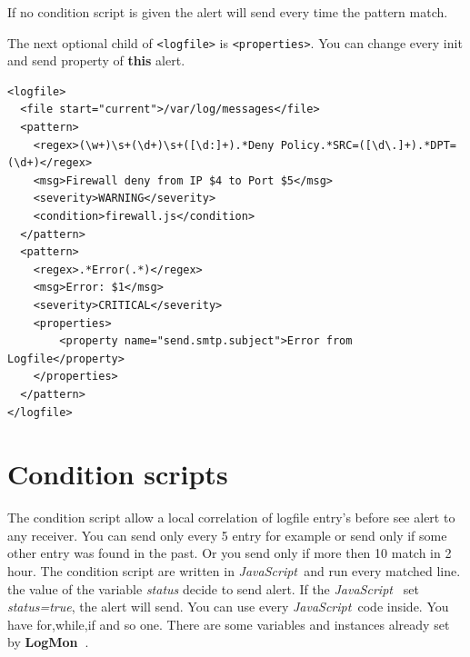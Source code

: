 \documentclass[11pt,a4paper]{article}
\newcommand{\logmon}{\textbf{LogMon\ }}
\newcommand{\js}{\textit{JavaScript\ }}
\begin{document}
If no condition script is given the alert will send every time the pattern
match.

The next optional child of \verb#<logfile># is \verb#<properties>#. You can
change every init and send property of \textbf{this} alert.

\begin{samepage}
\label{ex:logfile2}

\begin{verbatim}
<logfile>
  <file start="current">/var/log/messages</file>
  <pattern>
    <regex>(\w+)\s+(\d+)\s+([\d:]+).*Deny Policy.*SRC=([\d\.]+).*DPT=(\d+)</regex>
    <msg>Firewall deny from IP $4 to Port $5</msg>
    <severity>WARNING</severity>
    <condition>firewall.js</condition>
  </pattern>
  <pattern>
    <regex>.*Error(.*)</regex>
    <msg>Error: $1</msg>
    <severity>CRITICAL</severity>
    <properties>
        <property name="send.smtp.subject">Error from Logfile</property>
    </properties>
  </pattern>
</logfile>
\end{verbatim}
\end{samepage}

\section{Condition scripts}
\label{sec:conditions}

The condition script allow a local correlation of logfile entry's before
see alert to any receiver. You can send only every 5 entry for example or send only
if some other entry was found in the past. Or you send only if more then 10 match
in 2 hour. The condition script are written in \js and run every matched line.
the value of the variable \textit{status} decide to send alert. If the \js
set \textit{status=true}, the alert will send. You can use every \js code
inside. You have for,while,if and so one. There are some variables and instances
already set by \logmon.
\end{document}

